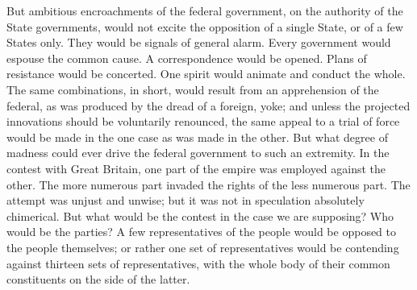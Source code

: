But ambitious encroachments of the federal government, on the authority of the State governments, would not excite the opposition of a single State, or of a few States only. 
They would be signals of general alarm. 
Every government would espouse the common cause. 
A correspondence would be opened. 
Plans of resistance would be concerted. 
One spirit would animate and conduct the whole. 
The same combinations, in short, would result from an apprehension of the federal, as was produced by the dread of a foreign, yoke; and unless the projected innovations should be voluntarily renounced, the same appeal to a trial of force would be made in the one case as was made in the other. 
But what degree of madness could ever drive the federal government to such an extremity. 
In the contest with Great Britain, one part of the empire was employed against the other. 
The more numerous part invaded the rights of the less numerous part. 
The attempt was unjust and unwise; but it was not in speculation absolutely chimerical. 
But what would be the contest in the case we are supposing? 
Who would be the parties? 
A few representatives of the people would be opposed to the people themselves; or rather one set of representatives would be contending against thirteen sets of representatives, with the whole body of their common constituents on the side of the latter.

